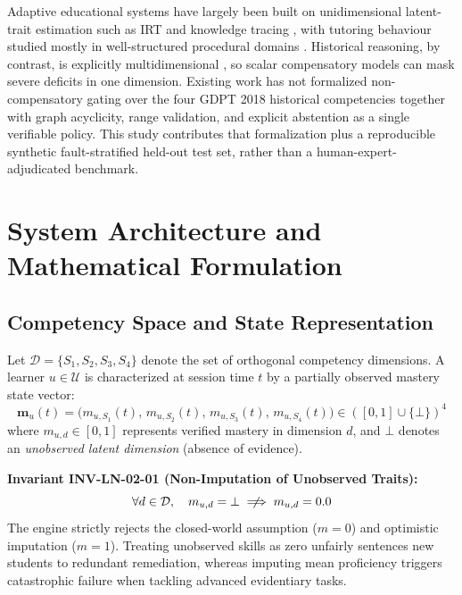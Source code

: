 \documentclass[11pt,a4paper]{article}
\begin{document}
Adaptive educational systems have largely been built on unidimensional latent-trait estimation such as IRT \cite{rasch1960probabilistic} and knowledge tracing \cite{piech2015deep}, with tutoring behaviour studied mostly in well-structured procedural domains \cite{vanlehn2006behavior, anderson2001taxonomy}. Historical reasoning, by contrast, is explicitly multidimensional \cite{seixas2013big, van2008historical}, so scalar compensatory models can mask severe deficits in one dimension. Existing work has not formalized non-compensatory gating over the four GDPT 2018 historical competencies \cite{moet2018gdpt} together with graph acyclicity, range validation, and explicit abstention as a single verifiable policy. This study contributes that formalization plus a reproducible synthetic fault-stratified held-out test set, rather than a human-expert-adjudicated benchmark.

\section{System Architecture and Mathematical Formulation}

\subsection{Competency Space and State Representation}

Let $\mathcal{D} = \{S_1, S_2, S_3, S_4\}$ denote the set of orthogonal competency dimensions. A learner $u \in \mathcal{U}$ is characterized at session time $t$ by a partially observed mastery state vector:
\begin{equation}
    \mathbf{m}_u(t) = \big( m_{u, S_1}(t),\, m_{u, S_2}(t),\, m_{u, S_3}(t),\, m_{u, S_4}(t) \big) \in ([0, 1] \cup \{\bot\})^4
\end{equation}
where $m_{u, d} \in [0, 1]$ represents verified mastery in dimension $d$, and $\bot$ denotes an \textit{unobserved latent dimension} (absence of evidence). 

\textbf{Invariant INV-LN-02-01 (Non-Imputation of Unobserved Traits):}
\begin{equation}
    \forall d \in \mathcal{D},\quad m_{u, d} = \bot \centernot\implies m_{u, d} = 0.0
\end{equation}
The engine strictly rejects the closed-world assumption ($m = 0$) and optimistic imputation ($m = 1$). Treating unobserved skills as zero unfairly sentences new students to redundant remediation, whereas imputing mean proficiency triggers catastrophic failure when tackling advanced evidentiary tasks.
\end{document}
